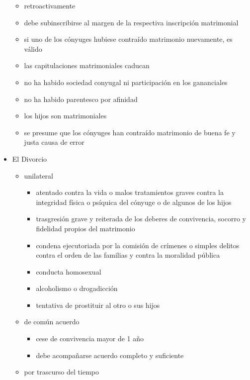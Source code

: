 \documentclass[]{article}
\providecommand{\tightlist}{%
  \setlength{\itemsep}{0pt}\setlength{\parskip}{0pt}}
\begin{document}
\begin{itemize}
  \begin{itemize}
  \tightlist
  \item
    retroactivamente
  \item
    debe subinscribirse al margen de la respectiva inscripción
    matrimonial
  \item
    si uno de los cónyuges hubiese contraído matrimonio nuevamente, es
    válido
  \item
    las capitulaciones matrimoniales caducan
  \item
    no ha habido sociedad conyugal ni participación en los gananciales
  \item
    no ha habido parentesco por afinidad
  \item
    los hijos son matrimoniales
  \item
    se presume que los cónyuges han contraído matrimonio de buena fe y
    justa causa de error
  \end{itemize}
\item
  El Divorcio

  \begin{itemize}
  \tightlist
  \item
    unilateral

    \begin{itemize}
    \tightlist
    \item
      atentado contra la vida o malos tratamientos graves contra la
      integridad física o psíquica del cónyuge o de algunos de los hijos
    \item
      trasgresión grave y reiterada de los deberes de convivencia,
      socorro y fidelidad propios del matrimonio
    \item
      condena ejecutoriada por la comisión de crímenes o simples delitos
      contra el orden de las familias y contra la moralidad pública
    \item
      conducta homosexual
    \item
      alcoholismo o drogadicción
    \item
      tentativa de prostituir al otro o sus hijos
    \end{itemize}
  \item
    de común acuerdo

    \begin{itemize}
    \tightlist
    \item
      cese de convivencia mayor de 1 año
    \item
      debe acompañarse acuerdo completo y suficiente
    \end{itemize}
  \item
    por trascurso del tiempo


\end{itemize}
\end{itemize}
\end{document}
